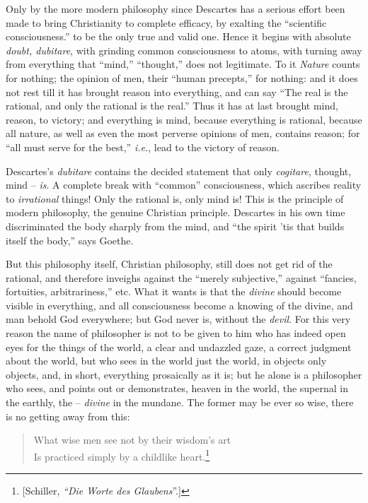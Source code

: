 Only by the more modern philosophy since Descartes has a serious effort been 
made to bring Christianity to complete efficacy, by exalting the ``scientific 
consciousness.'' to be the only true and valid one. Hence it begins with 
absolute \textit{doubt, dubitare}, with grinding common consciousness to 
atoms, with turning away from everything that ``mind,'' ``thought,'' does 
not legitimate. To it \textit{Nature} counts for nothing; the opinion of men, 
their ``human precepts,'' for nothing: and it does not rest till it has 
brought reason into everything, and can say ``The real is the rational, and 
only the rational is the real.'' Thus it has at last brought mind, reason, to 
victory; and everything is mind, because everything is rational, because all 
nature, as well as even the most perverse opinions of men, contains reason; 
for ``all must serve for the best,'' \textit{i.e.}, lead to the victory of 
reason.

Descartes's \textit{dubitare} contains the decided statement that only 
\textit{cogitare}, thought, mind -- \textit{is}. A complete break with 
``common'' consciousness, which ascribes reality to \textit{irrational} 
things! Only the rational is, only mind is! This is the principle of modern 
philosophy, the genuine Christian principle. Descartes in his own time 
discriminated the body sharply from the mind, and ``the spirit 'tis that 
builds itself the body,'' says Goethe.

But this philosophy itself, Christian philosophy, still does not get rid of 
the rational, and therefore inveighs against the ``merely subjective,'' 
against ``fancies, fortuities, arbitrariness,'' etc. What it wants is that 
the \textit{divine} should become visible in everything, and all consciousness 
become a knowing of the divine, and man behold God everywhere; but God never 
is, without the \textit{devil}. For this very reason the name of philosopher 
is not to be given to him who has indeed open eyes for the things of the 
world, a clear and undazzled gaze, a correct judgment about the world, but who 
sees in the world just the world, in objects only objects, and, in short, 
everything prosaically as it is; but he alone is a philosopher who sees, and 
points out or demonstrates, heaven in the world, the supernal in the earthly, 
the -- \textit{divine} in the mundane. The former may be ever so wise, there 
is no getting away from this:

\begin{quotation}

\noindent{}What wise men see not by their wisdom's art\\
 Is practiced simply by a childlike heart.\footnote{[Schiller, \textit{``Die 
Worte des Glaubens}''.]}\end{quotation}

